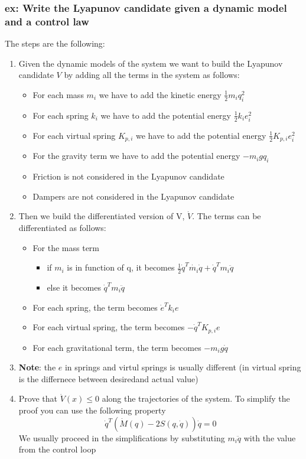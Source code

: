 \documentclass[a4paper,12pt]{article}
\begin{document}
\subsubsection{ex: Write the Lyapunov candidate given a dynamic model and a control law}
The steps are the following:
\begin{enumerate}
<<<<<<< Updated upstream
    \item Given the dynamic models of the system we want 
    to build the Lyapunov candidate $V$ by adding all the terms in the 
    system as follows:
    \begin{itemize} 
        \item For each mass $m_i$ we have to add the kinetic energy $\frac{1}{2}m_i q_i^2$
        \item For each spring $k_i$ we have to add the potential energy $\frac{1}{2}k_i e_i^2$
        \item For each virtual spring $K_{p,i}$ we have to add the potential energy $\frac{1}{2}K_{p,i} e_i^2$
        \item For the gravity term we have to add the potential energy $-m_i g q_i$
        \item Friction is not considered in the Lyapunov candidate
        \item Dampers are not considered in the Lyapunov candidate
    \end{itemize}
    \item Then we build the differentiated version of V, $\dot{V}$. The terms can be 
    differentiated as follows:
    \begin{itemize}
        \item For the mass term \begin{itemize}
            \item if $m_i$ is in function of q, it becomes $\frac{1}{2}\dot{q}^T\dot{m_i}\dot{q}+\dot{q}^Tm_i\ddot{q}$
            \item else it becomes $\dot{q}^Tm_i\ddot{q}$
        \end{itemize}
        \item For each spring, the term becomes $\dot{e}^Tk_ie$
        \item For each virtual spring, the term becomes $-\dot{q}^TK_{p,i}e$
        \item For each gravitational term, the term becomes $-m_i g \dot{q}$
    \end{itemize}
    \item \textbf{Note}: the $e$ in springs and virtul springs is usually different (in virtual spring
    is the differnece between desiredand actual value)
    \item Prove that $\dot{V}(x) \leq 0$ along the trajectories of the system. To simplify 
    the proof you can use the following property \begin{equation}
        \dot{q}^T(\dot{M}(q) - 2S(q,\dot{q}))\dot{q} = 0
    \end{equation} 
    We usually proceed in the simplifications by substituting $m_i \ddot{q}$ with
     the value from the control loop
     

\end{enumerate}
\end{document}
